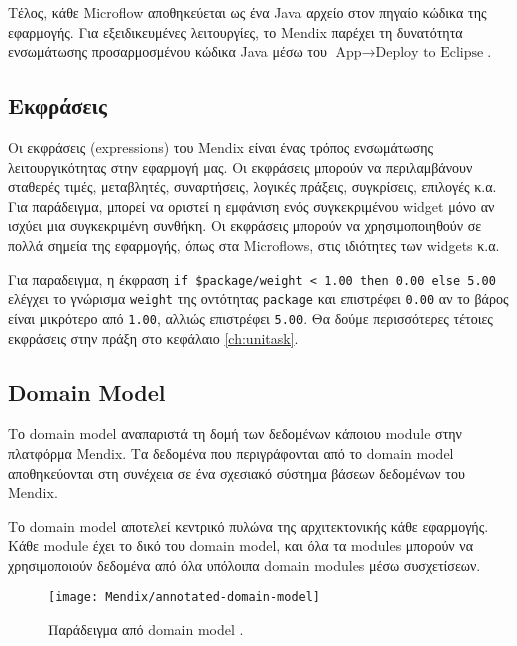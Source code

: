             Τέλος, κάθε Microflow αποθηκεύεται ως ένα Java αρχείο στον πηγαίο κώδικα της εφαρμογής. Για εξειδικευμένες λειτουργίες, το Mendix παρέχει τη δυνατότητα ενσωμάτωσης προσαρμοσμένου κώδικα Java μέσω του $ \text{App} \rightarrow \text{Deploy to Eclipse} $.

        \subsection{Εκφράσεις} \label{sec:MendixExpressions}
            Οι εκφράσεις (expressions) του Mendix είναι ένας τρόπος ενσωμάτωσης λειτουργικότητας στην εφαρμογή μας. Οι εκφράσεις μπορούν να περιλαμβάνουν σταθερές τιμές, μεταβλητές, συναρτήσεις, λογικές πράξεις, συγκρίσεις, επιλογές κ.α. Για παράδειγμα, μπορεί να οριστεί η εμφάνιση ενός συγκεκριμένου widget μόνο αν ισχύει μια συγκεκριμένη συνθήκη. Οι εκφράσεις μπορούν να χρησιμοποιηθούν σε πολλά σημεία της εφαρμογής, όπως στα Microflows, στις ιδιότητες των widgets κ.α.

            Για παραδειγμα, η έκφραση \verb|if $package/weight < 1.00 then 0.00 else 5.00| ελέγχει το γνώρισμα \texttt{weight} της οντότητας \texttt{package} και επιστρέφει \texttt{0.00} αν το βάρος είναι μικρότερο από \texttt{1.00}, αλλιώς επιστρέφει \texttt{5.00}. Θα δούμε περισσότερες τέτοιες εκφράσεις στην πράξη στο κεφάλαιο \ref{ch:unitask}.

        \subsection{Domain Model} \label{sec:MendixDomainModel}
            Το domain model αναπαριστά τη δομή των δεδομένων κάποιου module στην πλατφόρμα Mendix. Τα δεδομένα που περιγράφονται από το domain model αποθηκεύονται στη συνέχεια σε ένα σχεσιακό σύστημα βάσεων δεδομένων του Mendix.

            Το domain model αποτελεί κεντρικό πυλώνα της αρχιτεκτονικής κάθε εφαρμογής. Κάθε module έχει το δικό του domain model, και όλα τα modules μπορούν να χρησιμοποιούν δεδομένα από όλα υπόλοιπα domain modules μέσω συσχετίσεων.

            \begin{figure}[h!] \noindent \centering
                \texttt{[image: Mendix/annotated-domain-model]}
                \caption{\centering Παράδειγμα από domain model \cite{mendixDoc}.}
                \label{fig:MendixDomainModel}
            \end{figure}

